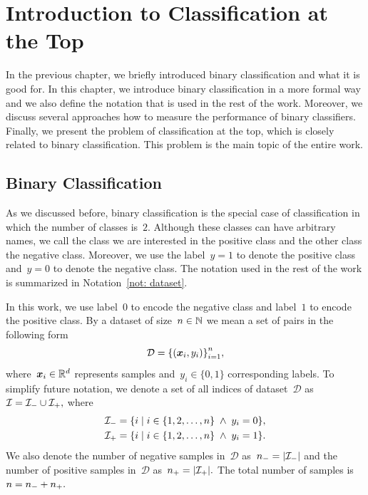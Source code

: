 \chapter{Introduction to Classification at the Top}\label{chap: binary classification}

In the previous chapter, we briefly introduced binary classification and what it is good for. In this chapter, we introduce binary classification in a more formal way and we also define the notation that is used in the rest of the work. Moreover, we discuss several approaches how to measure the performance of binary classifiers. Finally, we present the problem of classification at the top, which is closely related to binary classification. This problem is the main topic of the entire work.

\section{Binary Classification}

As we discussed before, binary classification is the special case of classification in which the number of classes is~$2.$ Although these classes can have arbitrary names, we call the class we are interested in the positive class and the other class the negative class. Moreover, we use the label~$y=1$ to denote the positive class and~$y=0$ to denote the negative class. The notation used in the rest of the work is summarized in Notation~\ref{not: dataset}.

\begin{notation}[Dataset]\label{not: dataset}
  In this work, we use label~$0$ to encode the negative class and label~$1$ to encode the positive class. By a dataset of size~$n \in \mathbb{N}$ we mean a set of pairs in the following form
  \begin{equation*}
    \mathcal{D} = \Brac[c]{(\bm{x}_i, y_i)}_{i=1}^{n},
  \end{equation*}
  where~$\bm{x}_i \in \mathbb{R}^d$ represents samples and~$y_i \in \{0, 1\}$ corresponding labels. To simplify future notation, we denote a set of all indices of dataset~$\mathcal{D}$ as~$\mathcal{I} = \mathcal{I}_{-} \cup \mathcal{I}_{+},$ where
  \begin{equation*}
    \begin{aligned}
      \Ineg & = \Set{i}{i \in \{1, 2, \ldots, n\} \; \land \; y_i = 0}, \\
      \Ipos & = \Set{i}{i \in \{1, 2, \ldots, n\} \; \land \; y_i = 1}.
    \end{aligned}
  \end{equation*}
  We also denote the number of negative samples in~$\mathcal{D}$ as~$\nneg = \Brac[v]{\Ineg}$ and the number of positive samples in~$\mathcal{D}$ as~$\npos = \Brac[v]{\Ipos}.$ The total number of samples is~$n = n_{-} + n_{+}.$ 
\end{notation}

